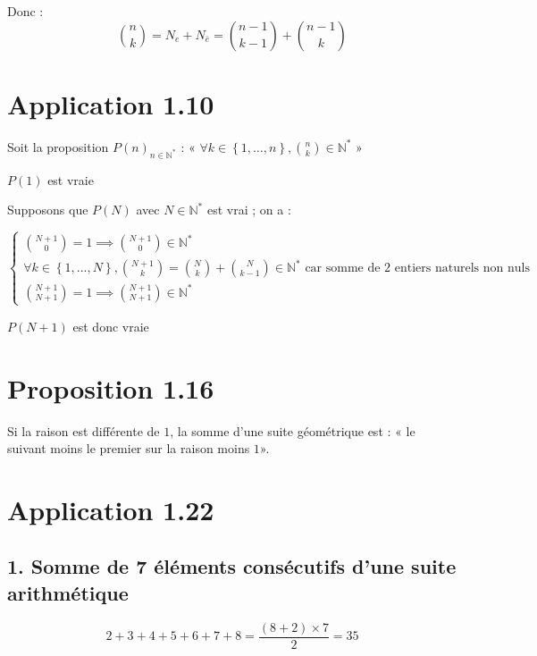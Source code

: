 \documentclass{report}
\begin{document}
Donc :
\begin{displaymath}
\binom{n}{k}= N_e + N_{\bar{e}} =  \binom{n-1}{k-1}+ \binom{n-1}{k}
\end{displaymath}


\section*{Application 1.10}

Soit la proposition $P(n)_{n \in \mathbb{N}^*}$ : « $\forall  k \in \left\lbrace 1,\ldots, n\right\rbrace, \binom{n}{k} \in \mathbb{N}^*$ »

$P(1)$ est vraie

Supposons que  $P(N)$ avec $N \in \mathbb{N}^*$ est vrai ; on a :

\begin{equation*}
	\begin{cases}
		\binom{N+1}{0} = 1 \implies \binom{N+1}{0} \in \mathbb{N}^* \\
		\forall k \in \left\lbrace 1, ... , N\right\rbrace , \binom{N+1}{k} = \binom{N}{k} + \binom{N}{k-1} \in \mathbb{N}^* \text{ car somme de 2 entiers naturels non nuls}\\
		\binom{N+1}{N+1} = 1  \implies \binom{N+1}{N+1} \in \mathbb{N}^*
	\end{cases}
\end{equation*}

$P(N+1)$ est donc vraie


\section*{Proposition 1.16}

Si la raison est différente de $1$, la somme d'une suite géométrique est : « le suivant moins le premier sur la raison moins $1$».

\section*{Application 1.22}

\subsection*{1. Somme de 7 éléments consécutifs d'une suite arithmétique}
\begin{displaymath}
	2 + 3 + 4 + 5 + 6 + 7 + 8 = \frac{(8+2)\times 7}{2} = 35
\end{displaymath}
\end{document}
